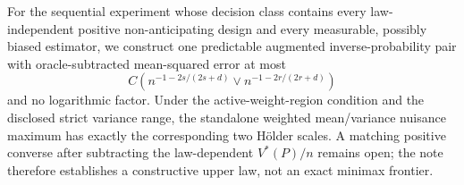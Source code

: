 For the sequential experiment whose decision class contains every law-independent positive non-anticipating design and every measurable, possibly biased estimator, we construct one predictable augmented inverse-probability pair with oracle-subtracted mean-squared error at most
\[
C\left(n^{-1-2s/(2s+d)}\vee n^{-1-2r/(2r+d)}\right)
\]
and no logarithmic factor.  Under the active-weight-region condition and the disclosed strict variance range, the standalone weighted mean/variance nuisance maximum has exactly the corresponding two Hölder scales.  A matching positive converse after subtracting the law-dependent \(V^*(P)/n\) remains open; the note therefore establishes a constructive upper law, not an exact minimax frontier.